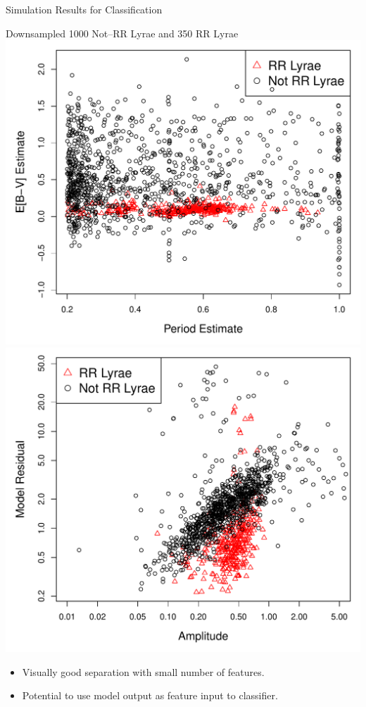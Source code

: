 \documentclass[12pt]{beamer}
\begin{document}
\begin{frame}{Simulation Results for Classification}

\begin{center}
Downsampled 1000 Not--RR Lyrae and 350 RR Lyrae
\includegraphics[scale=.33]{figs/period_vs_EBV.pdf}
\includegraphics[scale=.33]{figs/a_vs_dev_log.pdf}
\end{center}

\begin{itemize}
\item Visually good separation with small number of features.
\item Potential to use model output as feature input to classifier.
\end{itemize}
\end{frame}
\end{document}

